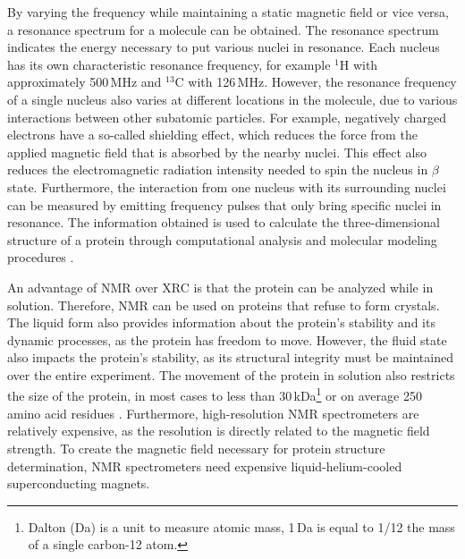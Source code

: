 By varying the frequency while maintaining a static magnetic field or vice versa, a resonance spectrum for a molecule can be obtained. The resonance spectrum indicates the energy necessary to put various nuclei in resonance. Each nucleus has its own characteristic resonance frequency, for example $^1$H with  approximately 500\,MHz and $^{13}$C with 126\,MHz. 
However, the resonance frequency of a single nucleus also varies at different locations in the molecule, due to various interactions between other subatomic particles. For example, negatively charged electrons have a so-called shielding effect, which reduces the force from the applied magnetic field that is absorbed by the nearby nuclei. 
This effect also reduces the electromagnetic radiation intensity needed to spin the nucleus  in 
 $\beta$ state.
Furthermore, the interaction from one nucleus with its surrounding nuclei can be measured by emitting frequency pulses that only bring specific nuclei in resonance. The information obtained is used to calculate the three-dimensional structure of a protein through computational analysis and molecular modeling procedures \cite{Edwards.2009}. 

An advantage of \ac{NMR} over \ac{XRC} is that the protein can be analyzed while in solution. Therefore, \ac{NMR} can be used on proteins that refuse to form crystals. 
The liquid form also provides information about the protein's stability and its dynamic processes, as the protein has freedom to move. However, the fluid state also impacts the protein's stability, as its structural integrity must be maintained over the entire experiment. The movement of the protein in solution also restricts the size of the protein, in most cases to less than  30\,kDa\footnote{Dalton (Da) is a unit to measure atomic mass, 1\,Da is equal to 1/12 the mass of a single carbon-12 atom. } or on average 250 amino acid residues \cite{Milo.2016}.
Furthermore, \mbox{high-resolution} \ac{NMR} spectrometers are relatively expensive, as the resolution is directly related to the magnetic field strength. To create the magnetic field necessary for protein structure determination, \ac{NMR} spectrometers  need expensive \mbox{liquid-helium-cooled} superconducting magnets.













